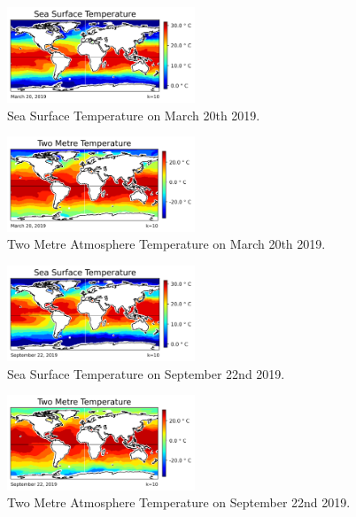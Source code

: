 \documentclass[conference,compsoc]{IEEEtran}
\begin{document}
\begin{figure}[htbp]
    \centerline{\includegraphics[width=0.5\textwidth]{figures/fig3.png}}
    \caption{Sea Surface Temperature on March 20th 2019.}
    \label{fig3}
\end{figure}
\begin{figure}[htbp]
    \centerline{\includegraphics[width=0.5\textwidth]{figures/fig4.png}}
    \caption{Two Metre Atmosphere Temperature on March 20th 2019.}
    \label{fig4}
\end{figure}
\begin{figure}[htbp]
    \centerline{\includegraphics[width=0.5\textwidth]{figures/fig5.png}}
    \caption{Sea Surface Temperature on September 22nd 2019.}
    \label{fig5}
\end{figure}
\begin{figure}[htbp]
    \centerline{\includegraphics[width=0.5\textwidth]{figures/fig6.png}}
    \caption{Two Metre Atmosphere Temperature on September 22nd 2019.}
    \label{fig6}
\end{figure}
\end{document}
